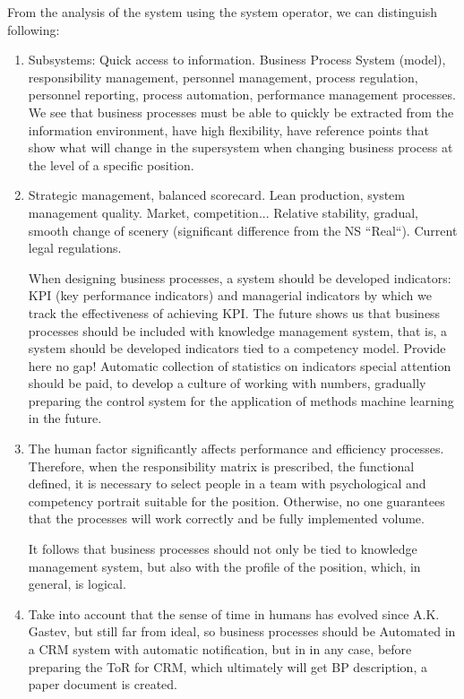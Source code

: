 \documentclass[11pt,a4paper]{book}
\begin{document}
From the analysis of the system using the system operator, we can distinguish
following:
\begin{enumerate}
\item Subsystems: Quick access to information. Business Process System
  (model), responsibility management, personnel management, process
  regulation, personnel reporting, process automation, performance management
  processes. We see that business processes must be able to quickly be
  extracted from the information environment, have high flexibility, have
  reference points that show what will change in the supersystem when changing
  business process at the level of a specific position.

\item Strategic management, balanced scorecard. Lean production, system
  management quality.  Market, competition...  Relative stability, gradual,
  smooth change of scenery (significant difference from the NS
  “Real“). Current legal regulations.

  When designing business processes, a system should be developed indicators:
  KPI (key performance indicators) and managerial indicators by which we track
  the effectiveness of achieving KPI.  The future shows us that business
  processes should be included with knowledge management system, that is, a
  system should be developed indicators tied to a competency model.  Provide
  here no gap! Automatic collection of statistics on indicators special
  attention should be paid, to develop a culture of working with numbers,
  gradually preparing the control system for the application of methods
  machine learning in the future.

\item The human factor significantly affects performance and efficiency
  processes. Therefore, when the responsibility matrix is prescribed, the
  functional defined, it is necessary to select people in a team with
  psychological and competency portrait suitable for the position. Otherwise,
  no one guarantees that the processes will work correctly and be fully
  implemented volume.

  It follows that business processes should not only be tied to knowledge
  management system, but also with the profile of the position, which, in
  general, is logical.

\item Take into account that the sense of time in humans has evolved since
  A.K. Gastev, but still far from ideal, so business processes should be
  Automated in a CRM system with automatic notification, but in in any case,
  before preparing the ToR for CRM, which ultimately will get BP description,
  a paper document is created.


\end{enumerate}
\end{document}
